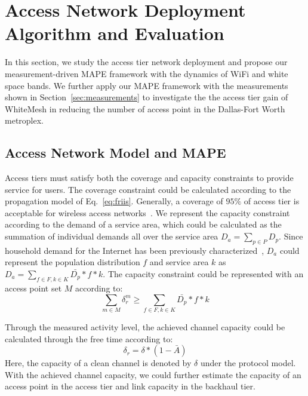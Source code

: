 \section{Access Network Deployment Algorithm and Evaluation}
\label{sec:winmee}

In this section, we study the access tier network deployment and propose our measurement-driven MAPE framework with the dynamics 
of WiFi and white space bands. We further apply our MAPE framework with the measurements shown in Section~\ref{sec:measurements}
to investigate the the access tier gain of WhiteMesh in reducing the number of access point in the Dallas-Fort Worth metroplex.

\subsection{Access Network Model and MAPE} 
\label{subsec:winmeemodel}


Access tiers must satisfy both the coverage and capacity constraints to provide service for users.
The coverage constraint could be calculated according to the propagation model of Eq.~\ref{eq:friis}. 
Generally, a coverage of $95\%$ of 
access tier is acceptable for wireless access networks~\cite{robinson2010deploying}. We represent the capacity 
constraint according to the demand of a service area, which could be calculated as the 
summation of individual demands all over the service area $D_a=\sum\limits_{p\in P} D_p$. Since household demand 
for the Internet has been previously characterized~\cite{rosston2011household}, $D_a$ could represent the 
population distribution $f$ and service area $k$ as $D_a=\sum\limits_{f \in F,k \in K}\bar{D_p}*f*k$. The capacity 
constraint could be represented with an access point set $M$ according to:
\begin{equation}
\label{eq:nlbound}
\sum_{m \in M}\delta_r^m \ge \sum_{f \in F,k \in K}\bar{D_p}*f*k
\end{equation}


Through the measured activity level, the achieved channel capacity could be calculated through the
free time according to:
\begin{equation}
\label{eq:intercap}
\delta_r=\delta*(1-\bar{A})
\end{equation}
Here, the capacity of a clean channel is denoted by $\delta$ under the protocol model. 
With the achieved channel capacity, we could further estimate the capacity of an access point in the access 
tier and link capacity in the backhaul tier.


